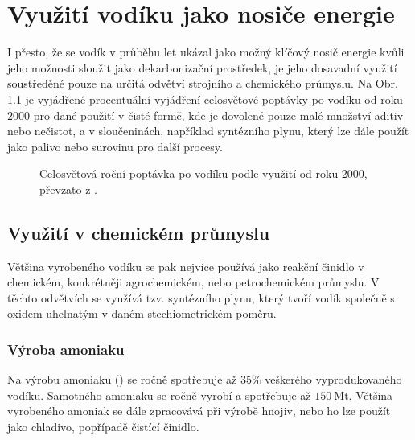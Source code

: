 \chapter{Využití vodíku jako nosiče energie}

I přesto, že se vodík v průběhu let ukázal jako možný klíčový nosič energie kvůli jeho možnosti sloužit jako dekarbonizační prostředek, je jeho dosavadní využití soustředěné pouze na určitá odvětví strojního a chemického průmyslu. \cite{Griffiths2021,IEAfuture} Na Obr. \ref{fig:pouziti_vodiku_proc} je vyjádřené procentuální vyjádření celosvětové poptávky po vodíku od roku $2000$ pro dané použití v čisté formě, kde je dovolené pouze malé množství aditiv nebo nečistot, a v sloučeninách, například syntézního plynu, který lze dále použít jako palivo nebo surovinu pro další procesy. \cite{IEAfuture}
\begin{figure}[h]
    \centering
    
    \caption[Celosvětová roční poptávka po vodíku podle využití od roku 2000]{Celosvětová roční poptávka po vodíku podle využití od roku 2000, převzato z \cite{IEAreview}.}
    \label{fig:pouziti_vodiku_proc}
\end{figure}

\section{Využití v chemickém průmyslu}
Většina vyrobeného vodíku se pak nejvíce používá jako reakční činidlo v chemickém, konkrétněji agrochemickém, nebo petrochemickém průmyslu. V těchto odvětvích se využívá tzv. syntézního plynu, který tvoří vodík společně s oxidem uhelnatým v daném stechiometrickém poměru. \cite{Seddon2022,IEAfuture}

\subsection{Výroba amoniaku}
Na výrobu amoniaku () se ročně spotřebuje až 35$\%$ veškerého vyprodukovaného vodíku. Samotného amoniaku se ročně vyrobí a spotřebuje až $150\ \mathrm{Mt}$. Většina vyrobeného amoniak se dále zpracovává při výrobě hnojiv, nebo ho lze použít jako chladivo, popřípadě čistící činidlo. \cite{Seddon2022,Ramachandran1998}

